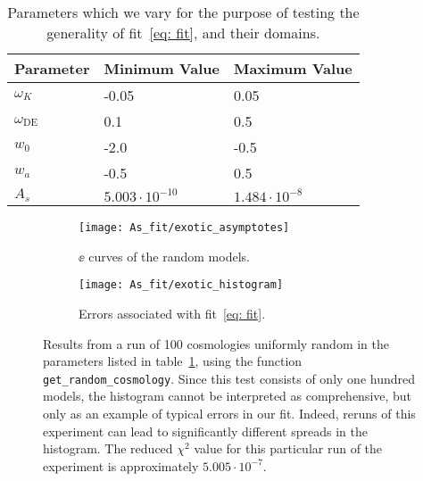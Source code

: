 \begin{table}[ht!]
\centering
\begin{tabular}{l|l|l}
\hline
Parameter & Minimum Value & Maximum Value \\ \hline
$\omega_K$ & -0.05 & 0.05 \\
$\omega_\text{DE}$\footnotemark & 0.1 & 0.5 \\
$w_0$ & -2.0 & -0.5 \\
$w_a$ & -0.5 & 0.5 \\
$A_s$\footnotemark & $5.003 \cdot 10^{-10}$ & $1.484 \cdot 10^{-8}$  \\
\end{tabular}
 \cprotect\caption[Parameter Ranges for Random Test
 	Cosmologies]{Parameters which we vary for the purpose of testing the
 	generality of fit~\ref{eq: fit}, and their domains.}
 \label{tab: fit_test_params}
\end{table}

\addtocounter{footnote}{-1}


\begin{figure}[ht!]
    \begin{subfigure}{0.45 \textwidth}
    \centering
 		\texttt{[image: As\_fit/exotic\_asymptotes]}
 		\cprotect\caption{$\ee$ curves of the random models.}
 		\label{fig: random_battery}
    \end{subfigure}
    \begin{subfigure}{0.45 \textwidth}
    \centering
 		\texttt{[image: As\_fit/exotic\_histogram]}
 		\caption{Errors associated with fit~\ref{eq: fit}.}
 		\label{fig: random_battery_errs}
    \end{subfigure}
        \centering
    \cprotect\caption[Random-cosmology Experiment]
    		{Results from a run of 100 cosmologies uniformly
    			random in the parameters listed in
    			table~\ref{tab: fit_test_params}, using the function
    			\verb|get_random_cosmology|. Since this test consists of
    			only one hundred models, the histogram cannot be interpreted as
    			comprehensive, but only as an example of typical errors in our
    			fit. Indeed, reruns of this experiment can lead to
    			significantly different spreads in the histogram.
    			The reduced $\chi^2$ value for this particular run of the
    			experiment is approximately $5.005 \cdot 10^{-7}$.}
    \label{fig: random_cosmology_experiment}
\end{figure}

